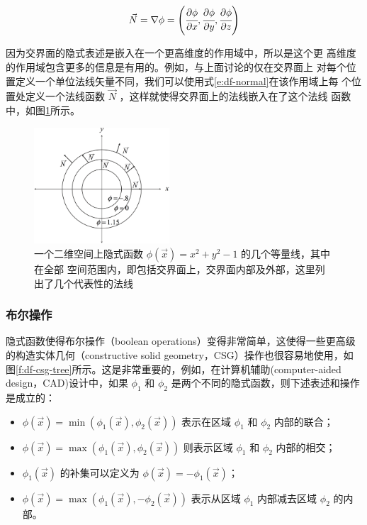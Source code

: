 \begin{equation}
	\vec{N}=\nabla\phi=\Biggl(	\cfrac{\partial\phi}{\partial x},\cfrac{\partial\phi}{\partial y},\cfrac{\partial\phi}{\partial z}\Biggl)
\end{equation}

因为交界面的隐式表述是嵌入在一个更高维度的作用域中，所以是这个更 高维度的作用域包含更多的信息是有用的。例如，与上面讨论的仅在交界面上 对每个位置定义一个单位法线矢量不同，我们可以使用式\ref{e:df-normal}在该作用域上每 个位置处定义一个法线函数 $\vec{N}$ ，这样就使得交界面上的法线嵌入在了这个法线 函数中，如图\ref{f:df-surface-normal}所示。

\begin{figure}
	\sidecaption
	\includegraphics[width=0.45\textwidth]{figures/df/gradient-of-implicit-function}
	\caption{一个二维空间上隐式函数 $\phi(\vec{x}) = x^{2} + y^{2} − 1$ 的几个等量线，其中在全部 空间范围内，即包括交界面上，交界面内部及外部，这里列出了几个代表性的法线}
	\label{f:df-surface-normal}
\end{figure}



\subsubsection{布尔操作}
隐式函数使得布尔操作（boolean operations）变得非常简单，这使得一些更高级的构造实体几何（constructive solid geometry，CSG）操作也很容易地使用，如图\ref{f:df-csg-tree}所示。这是非常重要的，例如，在计算机辅助(computer-aided design，CAD)设计中，如果 $\phi_1$ 和 $\phi_2$ 是两个不同的隐式函数，则下述表述和操作是成立的：

\begin{itemize}
	\item $\phi(\vec{x}) = \min(\phi_1(\vec{x}), \phi_2(\vec{x}))$ 表示在区域 $\phi_1$ 和 $\phi_2$ 内部的联合；
	\item  $\phi(\vec{x}) = \max(\phi_1(\vec{x}), \phi_2(\vec{x}))$ 则表示区域 $\phi_1$ 和 $\phi_2$ 内部的相交；
	\item $\phi_1(\vec{x})$ 的补集可以定义为 $\phi(\vec{x}) = −\phi_1(\vec{x})$；
	\item $\phi(\vec{x}) = \max(\phi_1(\vec{x}), −\phi_2(\vec{x}))$ 表示从区域 $\phi_1$ 内部减去区域 $\phi_2$ 的内部。
\end{itemize}

